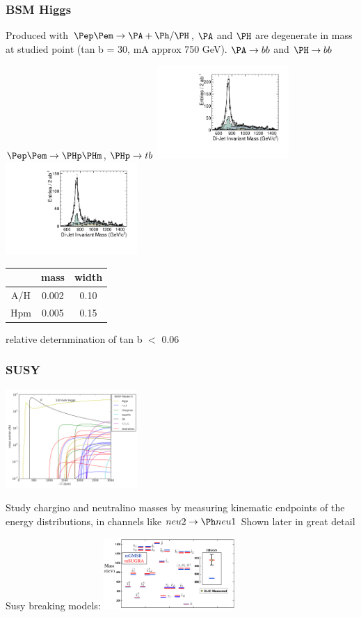 \documentclass{beamer}
\begin{document}
\begin{frame}
\frametitle{BSM Higgs}
Produced with $\Pep\Pem \to \PA+\Ph/\PH$, $\PA$ and $\PH$ are degenerate in
mass at studied point (tan b = 30, mA approx 750 GeV). $\PA\to bb$ and $\PH \to
bb$

$\Pep\Pem \to \PHp\PHm$, $\PHp\to tb$
\includegraphics[width=5cm]{../SIDWorkshop/HAMass742_Bkg_CKFM_00BX_FJ.pdf}
\includegraphics[width=5cm]{../SIDWorkshop/Hpm_Mass742_Bkg_CKFM_00BX_FJ.pdf}
\begin{tabular}{ccc}
\toprule
~ & mass & width\\
\midrule
A/H & 0.002 & 0.10\\
Hpm & 0.005 & 0.15\\
\bottomrule
\end{tabular}
relative deternmination of tan b $<$ 0.06
\end{frame}
\begin{frame}
\frametitle{SUSY}
\includegraphics[width=5cm]{../SIDWorkshop/susy_model2.png}

Study chargino and neutralino masses by measuring kinematic endpoints of the
energy distributions, in channels like $neu2\to \Ph neu1$ Shown later in great
detail

Susy breaking models:
\includegraphics[width=5cm]{../SIDWorkshop/GvM.png}
\end{frame}
\end{document}
